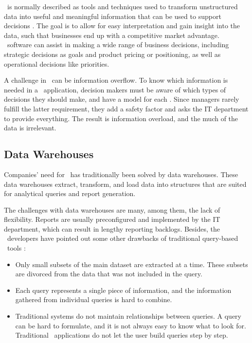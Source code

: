 \bi~is normally described as tools and techniques used to transform unstructured data into useful and meaningful information that can be used to support decisions \cite{Wikipedia_contributors2015-ag}. The goal is to allow for easy interpretation and gain insight into the data, such that businesses end up with a competitive market advantage. \bi~software can assist in making a wide range of business decisions, including strategic decisions as goals and product pricing or positioning, as well as operational decisions like priorities.

A challenge in \bi~can be information overflow. To know which information is needed in a \bi~application, decision makers must be aware of which types of decisions they should make, and have a model for each \cite{Ackoff1999-wk}. Since managers rarely fulfill the latter requirement, they add a safety factor and asks the IT department to provide everything. The result is information overload, and the much of the data is irrelevant. 

\subsection{Data Warehouses}
\label{sub:Data Warehouses}
Companies' need for \bi~has traditionally been solved by data warehouses. These data warehouses extract, transform, and load data into structures that are suited for analytical queries and report generation.

The challenges with data warehouses are many, among them, the lack of flexibility. Reports are usually preconfigured and implemented by the IT department, which can result in lengthy reporting backlogs. Besides, the \qlikview~developers have pointed out some other drawbacks of traditional query-based \bi~tools \cite{Qlik2010-ya}:
\begin{itemize}
  \item Only small subsets of the main dataset are extracted at a time. These subsets are divorced from the data that was not included in the query.
  \item Each query represents a single piece of information, and the information gathered from individual queries is hard to combine.
  \item Traditional systems do not maintain relationships between queries. A query can be hard to formulate, and it is not always easy to know what to look for. Traditional \bi~applications do not let the user build queries step by step.
\end{itemize}


